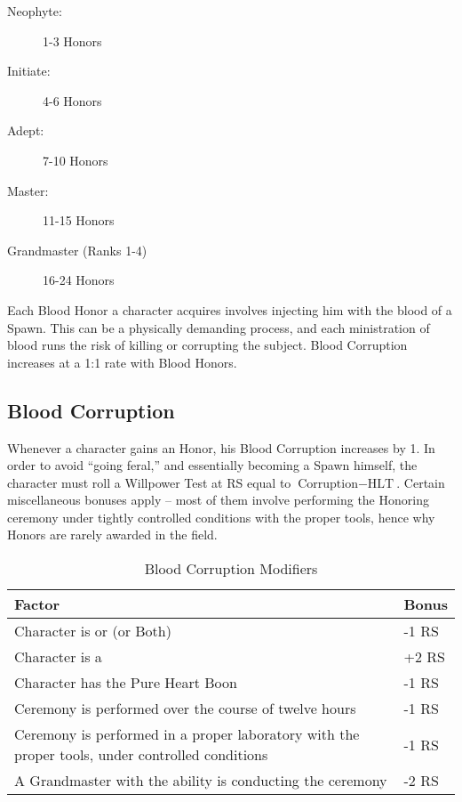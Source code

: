 \documentclass[oneside,11pt,english]{book}
\begin{document}
\begin{description}
	\item[Neophyte:] 1-3 Honors
	\item[Initiate:] 4-6 Honors
	\item[Adept:] 7-10 Honors
	\item[Master:] 11-15 Honors
	\item[Grandmaster (Ranks 1-4)] 16-24 Honors
\end{description}

Each Blood Honor a character acquires involves injecting him with the blood of a Spawn. This 
can be a physically demanding process, and each ministration of blood runs the risk of killing or 
corrupting the subject. Blood Corruption increases at a 1:1 rate with Blood Honors.

\subsection{Blood Corruption}
Whenever a character gains an Honor, his Blood Corruption increases by 1. In order to avoid 
“going feral,” and essentially becoming a Spawn himself, the character must roll a Willpower 
Test at RS equal to $ \text{Corruption}-\text{HLT} $. Certain miscellaneous bonuses apply -- most of them 
involve performing the Honoring ceremony under tightly controlled conditions with the proper 
tools, hence why Honors are rarely awarded in the field.

\begin{table}[ht]
	\centering
	\caption{Blood Corruption Modifiers}
	\label{tab: Blood Corruption Mods}
	\begin{tabu} spread 0pt {*{2}{X[-1]}}
		Factor&Bonus\\\toprule
		Character is  or  (or Both) &-1 RS\\
		Character is a &+2 RS\\
		Character has the Pure Heart Boon &-1 RS\\
		Ceremony is performed over the course of twelve hours&-1 RS\\
		Ceremony is performed in a proper laboratory with the proper tools, under controlled conditions &-1 RS\\
		A Grandmaster with the  ability is conducting the ceremony&-2 RS\\
	\end{tabu}
\end{table}
\end{document}
